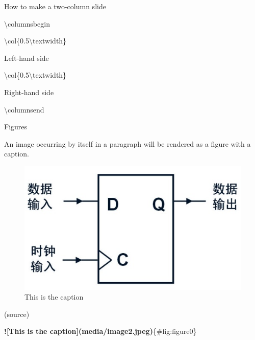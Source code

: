 \documentclass[10pt,ignorenonframetext,serif,onlymath]{beamer}
\newenvironment{Shaded}{}{}
\newcommand{\AlertTok}[1]{\textcolor[rgb]{1.00,0.00,0.00}{\textbf{#1}}}
\newcommand{\NormalTok}[1]{#1}
\begin{document}
\begin{frame}[fragile]{How to make a two-column slide}
\protect\hypertarget{sec:how-to-make-a-two-column-slide}{}

\begin{Shaded}
\begin{Highlighting}[]

\NormalTok{\textbackslash{}columnsbegin}

\NormalTok{\textbackslash{}col\{0.5\textbackslash{}textwidth\}}

\NormalTok{  Left-hand side}

\NormalTok{\textbackslash{}col\{0.5\textbackslash{}textwidth\}}

\NormalTok{  Right-hand side}

\NormalTok{\textbackslash{}columnsend}
\end{Highlighting}
\end{Shaded}

\end{frame}

\begin{frame}[fragile]{Figures}
\protect\hypertarget{sec:figures}{}

An image occurring by itself in a paragraph will be rendered as a figure
with a caption.

\begin{figure}
\hypertarget{fig:figure0}{%
\centering
\includegraphics{media/image2.jpeg}
\caption{This is the caption}\label{fig:figure0}
}
\end{figure}

(source)

\begin{Shaded}
\begin{Highlighting}[]
\AlertTok{![This is the caption](media/image2.jpeg)}\NormalTok{\{#fig:figure0\}}
\end{Highlighting}
\end{Shaded}

\end{frame}
\end{document}
